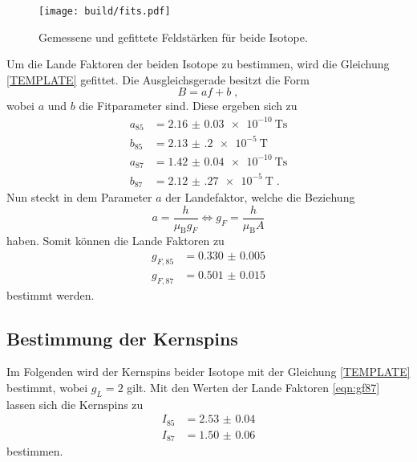 \begin{figure}
    \centering
    \caption{Gemessene und gefittete Feldstärken für beide Isotope.}
    \label{fig:fit}
    \texttt{[image: build/fits.pdf]}
\end{figure}
Um die Lande Faktoren der beiden Isotope zu bestimmen, wird die Gleichung \eqref{TEMPLATE} gefittet.
Die Ausgleichsgerade besitzt die Form
\begin{equation*}
    B =  af + b \; ,
\end{equation*} 
wobei $a$ und $b$ die Fitparameter sind.
Diese ergeben sich zu 
\begin{align*}
    a_{85} &= \qty{2.16(3)e-10}{\tesla\second}   \\
    b_{85} &= \qty{2.13(20)e-5}{\tesla}            \\
    a_{87} &= \qty{1.42(4)e-10}{\tesla\second}   \\
    b_{87} &= \qty{2.12(27)e-5}{\tesla}            \; .
\end{align*}
Nun steckt in dem Parameter $a$ der Landefaktor, welche die Beziehung 
\begin{equation*}
    a = \frac{h}{\mu_\text{B}g_F} \iff g_F = \frac{h}{\mu_\text{B}A}
\end{equation*}
haben.
Somit können die Lande Faktoren zu 
\begin{align}
    g_{F, 85} &= \num{0.330(5)} \\ 
    g_{F, 87} &= \num{0.501(15)}    \label{eqn:gf87}
\end{align}
bestimmt werden.
\subsection{Bestimmung der Kernspins}
Im Folgenden wird der Kernspins beider Isotope mit der Gleichung \eqref{TEMPLATE} bestimmt, wobei 
$g_L  = 2 $ gilt.
Mit den Werten der Lande Faktoren \eqref{eqn:gf87} lassen sich die Kernspins zu 
\begin{align*}
    I_{85} &= \num{2.53(4)} \\ 
    I_{87} &= \num{1.50(6)}  
\end{align*}
bestimmen.
